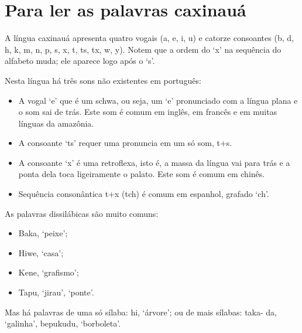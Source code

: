 \chapter{Para ler as palavras caxinauá}


A língua caxinauá apresenta quatro vogais (a, e, i, u) e catorze consoantes (b, d, h, k, m, n, p, s, x, t, ts, tx, w, y). Notem que a ordem do ‘x’ na sequência do alfabeto muda;
ele aparece logo após o ‘s’.

Nesta língua há três sons não existentes em português:

\begin{itemize}
\item A vogal ‘e’ que é um schwa, ou seja, um ‘e’ pronunciado com a língua plana e o som sai de trás. Este som é comum em inglês, em francês e em muitas línguas da amazônia.

\item A consoante ‘ts’ requer uma pronuncia em um só som, t+s. 

\item A consoante ‘x’ é uma retroflexa, isto é, a massa da língua vai para trás e a ponta dela toca ligeiramente o palato. Este som é comum em chinês.

\item Sequência consonântica t+x (tch) é comum em espanhol, grafado ‘ch’.
\end{itemize}

As palavras dissilábicas são muito comuns:

\begin{itemize}

\item Baka, ‘peixe’;

\item Hiwe, ‘casa’;

\item Kene, ‘grafismo’;

\item Tapu, ‘jirau’, ‘ponte’.
\end{itemize}

Mas há palavras de uma só sílaba: hi, ‘árvore’; ou de mais sílabas: taka- da, ‘galinha’, bepukudu, ‘borboleta’.


